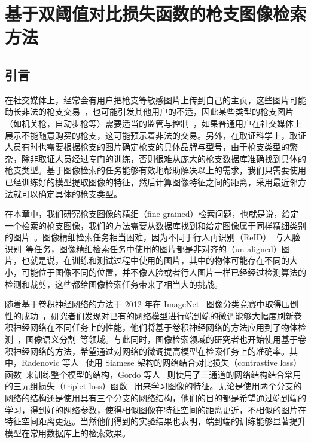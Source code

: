 
\chapter{基于双阈值对比损失函数的枪支图像检索方法}\label{chapter:double_margin}

\section{引言}
在社交媒体上，经常会有用户把枪支等敏感图片上传到自己的主页，这些图片可能助长非法的枪支交易~\cite{Drange2016,MELE2016FacebookBG}，也可能引发其他用户的不适，因此某些类型的枪支图片（如机关枪，自动步枪等）需要适当的监管与控制~\cite{Hsu2018Bumble}，如果普通用户在社交媒体上展示不能随意购买的枪支，这可能预示着非法的交易。另外，在取证科学上，取证人员有时也需要根据枪支的图片确定枪支的具体品牌与型号，由于枪支类型的繁杂，除非取证人员经过专门的训练，否则很难从庞大的枪支数据库准确找到具体的枪支类型。基于图像检索的任务能够有效地帮助解决以上的需求，我们只需要使用已经训练好的模型提取图像的特征，然后计算图像特征之间的距离，采用最近邻方法就可以确定具体的枪支类型。

在本章中，我们研究枪支图像的精细（fine-grained）检索问题，也就是说，给定一个检索的枪支图像，我们的方法需要从数据库找到和给定图像属于同样精细类别的图片~\cite{Song2016DeepML,Wang2017DeepML}。图像精细检索任务相当困难，因为不同于行人再识别（ReID）~\cite{Zhao2013UnsupervisedSL,Li2014DeepReIDDF}与人脸识别~\cite{Wen2016ADF,Taigman2014DeepFaceCT}等任务，图像精细检索任务中使用的图片都是非对齐的（un-aligned）图片，也就是说，在训练和测试过程中使用的图片，其中的物体可能存在不同的大小，可能位于图像不同的位置，并不像人脸或者行人图片一样已经经过检测算法的检测和裁剪，这些都给图像检索任务带来了相当大的挑战。

随着基于卷积神经网络的方法于 2012 年在 ImageNet~\cite{Russakovsky2015ImageNetLS} 图像分类竞赛中取得压倒性的成功~\cite{Krizhevsky2012ImageNetCW}，研究者们发现对已有的网络模型进行端到端的微调能够大幅度刷新卷积神经网络在不同任务上的性能，他们将基于卷积神经网络的方法应用到了物体检测~\cite{Liu2016SSDSS,Redmon2016YouOL,Lin2017FocalLF,Ren2017FasterRT}，图像语义分割~\cite{Shelhamer2017FullyCN,Chen2018DeepLabSI,Noh2015LearningDN}等领域。与此同时，图像检索领域的研究者也开始使用基于卷积神经网络的方法，希望通过对网络的微调提高模型在检索任务上的准确率。其中，Radenovic 等人~\cite{Radenovic2016CNNIR} 使用 Siamese 架构的网络结合对比损失（contrastive loss）函数~\cite{Chopra2005LearningAS,Hadsell2006DimensionalityRB,Han2015MatchNetUF}来训练整个模型的结构，Gordo 等人~\cite{Gordo2016DeepIR} 则使用了三通道的网络结构结合常用的三元组损失（triplet loss）函数~\cite{Schroff2015FaceNetAU,Wang2014LearningFI,G2016LearningLI,Weinberger2006DistanceML} 用来学习图像的特征。无论是使用两个分支的网络的结构还是使用具有三个分支的网络结构，他们的目的都是希望通过端到端的学习，得到好的网络参数，使得相似图像在特征空间的距离更近，不相似的图片在特征空间距离更远。当然他们得到的实验结果也表明，端到端的训练能够显著提升模型在常用数据库上的检索效果。

